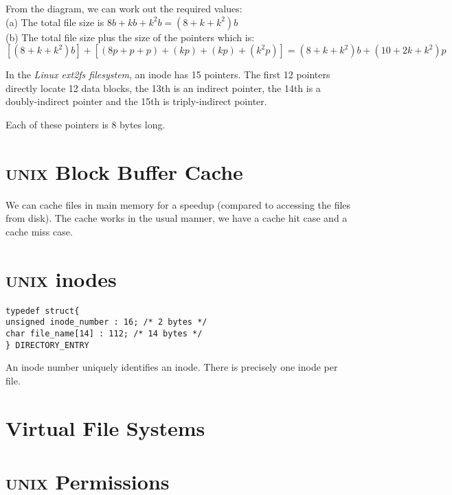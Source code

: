 From the diagram, we can work out the required values:\\
(a) The total file size is $8b + kb + k^2b = (8+k+k^2)b$ \\
(b) The total file size plus the size of the pointers which is:
$[(8+k+k^2)b] + [(8p + p + p) + (kp) + (kp) + (k^2p)] = (8+k+k^2)b + (10+2k+k^2)p$










\begin{example}
In the \textit{Linux ext2fs filesystem}, an inode has 15 pointers.
The first 12 pointers directly locate 12 data blocks, 
the 13th is an indirect pointer, the 14th is a doubly-indirect pointer and the 
15th is triply-indirect pointer. 

Each of these pointers is 8 bytes long.

\end{example}




\section{\textsc{unix} Block Buffer Cache}

We can cache files in main memory for a speedup (compared to accessing the files 
from disk). The cache works in the usual manner, we have a cache hit case and a 
cache miss case.



\section{\textsc{unix} inodes}


\begin{lstlisting}
typedef struct{
unsigned inode_number : 16; /* 2 bytes */
char file_name[14] : 112; /* 14 bytes */
} DIRECTORY_ENTRY
\end{lstlisting}

An inode number uniquely identiﬁes an inode.
There is precisely one inode per ﬁle.

\section{Virtual File Systems}


\section{\textsc{unix} Permissions}


